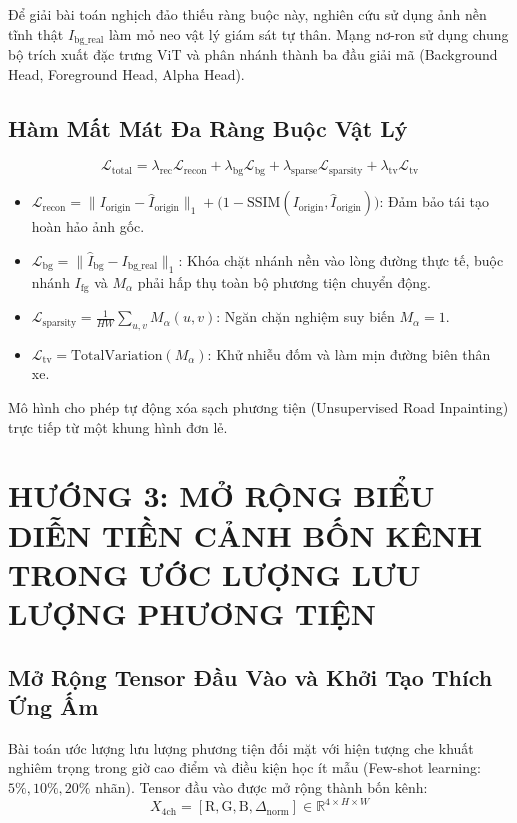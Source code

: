\documentclass[11pt,a4paper]{article}
\begin{document}
Để giải bài toán nghịch đảo thiếu ràng buộc này, nghiên cứu sử dụng ảnh nền tĩnh thật $I_{\text{bg\_real}}$ làm mỏ neo vật lý giám sát tự thân. Mạng nơ-ron sử dụng chung bộ trích xuất đặc trưng ViT và phân nhánh thành ba đầu giải mã (Background Head, Foreground Head, Alpha Head).

\subsection{Hàm Mất Mát Đa Ràng Buộc Vật Lý}
\begin{equation}
    \mathcal{L}_{\text{total}} = \lambda_{\text{rec}} \mathcal{L}_{\text{recon}} + \lambda_{\text{bg}} \mathcal{L}_{\text{bg}} + \lambda_{\text{sparse}} \mathcal{L}_{\text{sparsity}} + \lambda_{\text{tv}} \mathcal{L}_{\text{tv}}
\end{equation}
\begin{itemize}
    \item $\mathcal{L}_{\text{recon}} = \|I_{\text{origin}} - \hat{I}_{\text{origin}}\|_{1} + \big(1 - \text{SSIM}(I_{\text{origin}}, \hat{I}_{\text{origin}})\big)$: Đảm bảo tái tạo hoàn hảo ảnh gốc.
    \item $\mathcal{L}_{\text{bg}} = \|\hat{I}_{\text{bg}} - I_{\text{bg\_real}}\|_{1}$: Khóa chặt nhánh nền vào lòng đường thực tế, buộc nhánh $I_{\text{fg}}$ và $M_\alpha$ phải hấp thụ toàn bộ phương tiện chuyển động.
    \item $\mathcal{L}_{\text{sparsity}} = \frac{1}{HW} \sum_{u, v} M_{\alpha}(u, v)$: Ngăn chặn nghiệm suy biến $M_{\alpha} = 1$.
    \item $\mathcal{L}_{\text{tv}} = \text{TotalVariation}(M_{\alpha})$: Khử nhiễu đốm và làm mịn đường biên thân xe.
\end{itemize}
Mô hình cho phép tự động xóa sạch phương tiện (Unsupervised Road Inpainting) trực tiếp từ một khung hình đơn lẻ.

\section{HƯỚNG 3: MỞ RỘNG BIỂU DIỄN TIỀN CẢNH BỐN KÊNH TRONG ƯỚC LƯỢNG LƯU LƯỢNG PHƯƠNG TIỆN}

\subsection{Mở Rộng Tensor Đầu Vào và Khởi Tạo Thích Ứng Ấm}
Bài toán ước lượng lưu lượng phương tiện đối mặt với hiện tượng che khuất nghiêm trọng trong giờ cao điểm và điều kiện học ít mẫu (Few-shot learning: $5\%, 10\%, 20\%$ nhãn). Tensor đầu vào được mở rộng thành bốn kênh:
\begin{equation}
    X_{\text{4ch}} = [\text{R}, \text{G}, \text{B}, \Delta_{\text{norm}}] \in \mathbb{R}^{4 \times H \times W}
\end{equation}
\end{document}
